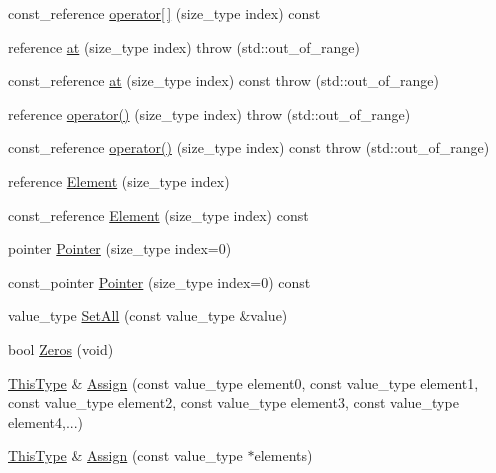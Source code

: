 \begin{DoxyCompactItemize}
\item 
const\-\_\-reference \hyperlink{classvct_fixed_size_vector_base_aab4c42f30b4481af7073b7993038389a}{operator\mbox{[}$\,$\mbox{]}} (size\-\_\-type index) const 
\item 
reference \hyperlink{classvct_fixed_size_vector_base_a787ffed04af0ebdde525c08e2da704da}{at} (size\-\_\-type index)  throw (std\-::out\-\_\-of\-\_\-range)
\item 
const\-\_\-reference \hyperlink{classvct_fixed_size_vector_base_a0425241e2ca18a9e3554cf9d58737cc3}{at} (size\-\_\-type index) const   throw (std\-::out\-\_\-of\-\_\-range)
\item 
reference \hyperlink{classvct_fixed_size_vector_base_a768864b05bd40054ca17a3ed0027ea54}{operator()} (size\-\_\-type index)  throw (std\-::out\-\_\-of\-\_\-range)
\item 
const\-\_\-reference \hyperlink{classvct_fixed_size_vector_base_a3d3ccc563d1d76820801178d2907f151}{operator()} (size\-\_\-type index) const   throw (std\-::out\-\_\-of\-\_\-range)
\item 
reference \hyperlink{classvct_fixed_size_vector_base_a571a7569f74a7dc6c25dc29794cfbe23}{Element} (size\-\_\-type index)
\item 
const\-\_\-reference \hyperlink{classvct_fixed_size_vector_base_a0b851f0bbe19cf157082e8abb819a558}{Element} (size\-\_\-type index) const 
\item 
pointer \hyperlink{classvct_fixed_size_vector_base_aa71ce242a6bb5be99f1ee03734a0ea79}{Pointer} (size\-\_\-type index=0)
\item 
const\-\_\-pointer \hyperlink{classvct_fixed_size_vector_base_aff11b9ec1fc5c53e04d3cb4c416c3b66}{Pointer} (size\-\_\-type index=0) const 
\item 
value\-\_\-type \hyperlink{classvct_fixed_size_vector_base_ae0659dd664fd0be5b5c4ff9c2d13c64e}{Set\-All} (const value\-\_\-type \&value)
\item 
bool \hyperlink{classvct_fixed_size_vector_base_ae05c0457787820f7bc312da5444a14d9}{Zeros} (void)
\item 
\hyperlink{classvct_fixed_size_const_vector_base_a071063bc4fa43112cc287b2dbef53180}{This\-Type} \& \hyperlink{classvct_fixed_size_vector_base_ac22e9269ac2c76822cf4889053063f66}{Assign} (const value\-\_\-type element0, const value\-\_\-type element1, const value\-\_\-type element2, const value\-\_\-type element3, const value\-\_\-type element4,...)
\item 
\hyperlink{classvct_fixed_size_const_vector_base_a071063bc4fa43112cc287b2dbef53180}{This\-Type} \& \hyperlink{classvct_fixed_size_vector_base_a38d50afd2b6bc08c82a9aac3ecba8a3d}{Assign} (const value\-\_\-type $\ast$elements)

\end{DoxyCompactItemize}
